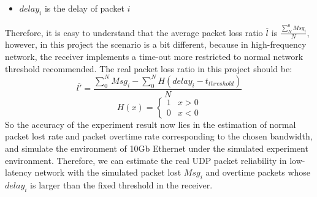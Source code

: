 \documentclass[11pt,openright,a4paper]{report}
\begin{document}
\begin{itemize}
	\item $delay_{i}$ is the delay of packet $i$
\end{itemize}
Therefore, it is easy to understand that the average packet loss ratio $\overline{l}$ is $\frac{\sum_{N}^{0}Msg_{i}}{N}$, however, in this project the scenario is a bit different, because in high-frequency network, the receiver implements a time-out more restricted to normal network threshold recommended\cite{eggert2009tcp}. The real packet loss ratio in this project should be:
\begin{equation}
	\overline{{l}'}=\frac{\sum_{0}^{N}Msg_{i}-\sum_{0}^{N} H(delay_{i}-t_{threshold})}{N}
\end{equation}
\begin{equation}
	H(x)=\begin{cases}
	1 & x>0
	\\
	0 & x<0
	\end{cases}
\end{equation}
So the accuracy of the experiment result now lies in the estimation of normal packet lost rate and packet overtime rate corresponding to the chosen bandwidth, and simulate the environment of 10Gb Ethernet under the simulated experiment environment. Therefore, we can estimate the real UDP packet reliability in low-latency network with the simulated packet lost $Msg_{i}$ and overtime packets whose $delay_{i}$ is larger than the fixed threshold in the receiver.\\
\end{document}
